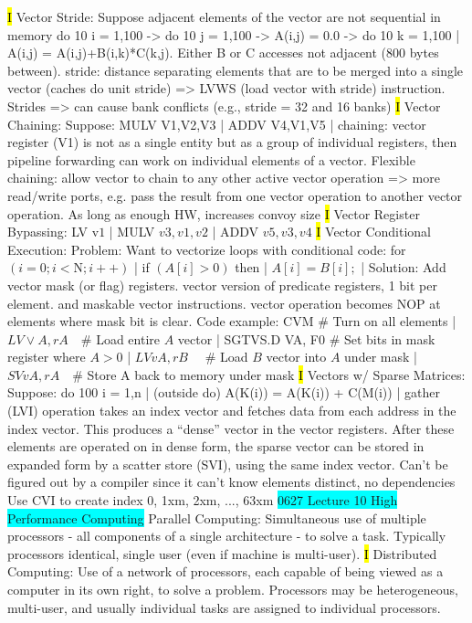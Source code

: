 \documentclass[fontsize=4pt]{scrartcl}
\begin{document}
\hl{I}
Vector Stride: Suppose adjacent elements of the vector are not sequential in memory do 10 i = 1,100 -> do 10 j = 1,100 -> A(i,j) = 0.0 -> do 10 k = 1,100 | A(i,j) = A(i,j)+B(i,k)*C(k,j). Either B or C accesses not adjacent (800 bytes between). stride: distance separating elements that are to be merged into a single vector (caches do unit stride) => LVWS (load vector with stride) instruction. Strides => can cause bank conflicts (e.g., stride = 32 and 16 banks)
\hl{I}
Vector Chaining: Suppose: MULV V1,V2,V3 | ADDV	V4,V1,V5 | chaining: vector register (V1) is not as a single entity but as a group of individual registers, then pipeline forwarding can work on individual elements of a vector. Flexible chaining: allow vector to chain to any other active vector operation => more read/write ports, e.g. pass the result from one vector operation to another vector operation. As long as enough HW, increases convoy size
\hl{I}
Vector Register Bypassing: LV $\mathrm{v} 1$ | MULV $v 3, v 1, v 2$ | ADDV $v 5, v 3, v 4$
\hl{I}
Vector Conditional Execution: Problem: Want to vectorize loops with conditional code: for $(i=0 ; i<\mathrm{N} ; i++)$ | if $(A[i]>0)$ then | $A[i]=B[i] ;$ | Solution: Add vector mask (or flag) registers. vector version of predicate registers, 1 bit per element. and maskable vector instructions. vector operation becomes NOP at elements where mask bit is clear. Code example:
CVM \# Turn on all elements | $L V \vee A, r A \quad \#$ Load entire $A$ vector | SGTVS.D VA, F0 # Set bits in mask register where $A>0$ | $L V v A, r B \quad$ # Load $B$ vector into $A$ under mask | $S V v A, r A \quad \#$ Store A back to memory under mask
\hl{I}
Vectors w/ Sparse Matrices: Suppose: do	100 i = 1,n | (outside do) A(K(i)) = A(K(i)) + C(M(i)) | gather (LVI) operation takes an index vector and fetches data from each address in the index vector. This produces a “dense” vector in the vector registers. After these elements are operated on in dense form,  the sparse vector can be stored in expanded form by a scatter store (SVI), using the same index vector. Can't be figured out by a compiler since it can't know elements distinct, no dependencies
Use CVI to create index 0, 1xm, 2xm, ..., 63xm
\colorbox{Cyan}{0627 Lecture 10 High Performance Computing}
Parallel Computing: Simultaneous use of multiple processors - all components of a single architecture - to solve a task. Typically processors identical, single user (even if machine is multi-user).
\hl{I}
Distributed Computing: Use of a network of processors, each capable of being viewed as a computer in its own right, to solve a problem. Processors  may be heterogeneous, multi-user, and usually individual tasks are assigned  to individual processors.
\end{document}
